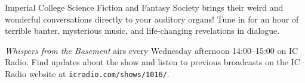 
Imperial College Science Fiction and Fantasy Society brings their
weird and wonderful conversations directly to your auditory organs!
Tune in for an hour of terrible banter, mysterious music, and
life-changing revelations in dialogue.

\textit{Whispers from the Basement} airs every Wednesday afternoon
14:00--15:00 on IC Radio. Find updates about the show and listen to
previous broadcasts on the IC Radio website
at \texttt{icradio.com/shows/1016/}.
